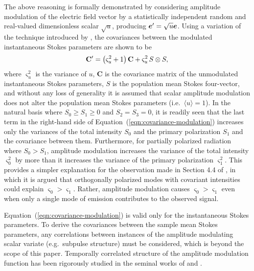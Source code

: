 \documentclass[twocolumn]{aastex6}
\newcommand{\mbf}[1]{\mbox{\boldmath $#1$}}
\newcommand{\Eqn}[1]{Equation~(\ref{eqn:#1})}
\begin{document}
The above reasoning is formally demonstrated by considering
amplitude modulation of the electric field vector by a statistically
independent random and real-valued dimensionless scalar $\sqrt{u}$,
producing $\mbf{e}^\prime = \sqrt{u}\mbf{e}$.
%
Using a variation of the technique introduced by \citet{goo60}, the
covariances between the modulated instantaneous Stokes parameters are
shown to be
%
%
%
%
\begin{equation}
{\bf C}^\prime = \left( \varsigma_u^2 + 1\right) {\bf C}
                 + \varsigma_u^2\, S\otimes S,
\label{eqn:covariance-modulation}
\end{equation}
where $\varsigma_u^2$ is the variance of $u$,
%
{\bf C} is the covariance matrix of the unmodulated instantaneous
Stokes parameters, $S$ is the population mean Stokes four-vector, and
without any loss of generality it is assumed that scalar amplitude
modulation does not alter the population mean Stokes parameters
(i.e.\ $\langle u \rangle = 1$).
%
In the natural basis where $S_0 \ge S_1 \ge 0$ and $S_2=S_3=0$, it is
readily seen that the last term in the right-hand side of
\Eqn{covariance-modulation} increases only the variances of the total
intensity $S_0$ and the primary polarization $S_1$ and the covariance
between them.
%
Furthermore, for partially polarized radiation where $S_0 > S_1$,
amplitude modulation increases the variance of the total intensity
$\varsigma_0^2$ by more than it increases the variance of the
primary polarization $\varsigma_1^2$.
%
This provides a simpler explanation for the observation made in
Section 4.4 of \citet{van09}, in which it is argued that orthogonally
polarized modes with covariant intensities could explain $\varsigma_0
> \varsigma_1$.
%
Rather, amplitude modulation causes $\varsigma_0 > \varsigma_1$ even
when only a single mode of emission contributes to the observed
signal.

\Eqn{covariance-modulation} is valid only for the instantaneous Stokes
parameters.
%
To derive the covariances between the sample mean Stokes parameters,
any correlations between instances of the amplitude modulating scalar
variate (e.g.\ subpulse structure) must be considered, which is beyond
the scope of this paper.
%
Temporally correlated structure of the amplitude modulation function
has been rigorously studied in the seminal works of \citet{ric75} and
\citet{cor76}.
\end{document}
